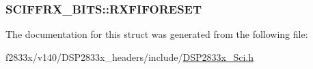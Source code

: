 \subsubsection[{R\+X\+F\+I\+F\+O\+R\+E\+S\+E\+T}]{ S\+C\+I\+F\+F\+R\+X\+\_\+\+B\+I\+T\+S\+::\+R\+X\+F\+I\+F\+O\+R\+E\+S\+E\+T}\label{struct_s_c_i_f_f_r_x___b_i_t_s_a7d1d1dbf7c40ada7de65f9a06f8f3f51}


The documentation for this struct was generated from the following file\+:\begin{DoxyCompactItemize}
\item 
f2833x/v140/\+D\+S\+P2833x\+\_\+headers/include/\hyperlink{_d_s_p2833x___sci_8h}{D\+S\+P2833x\+\_\+\+Sci.\+h}\end{DoxyCompactItemize}

